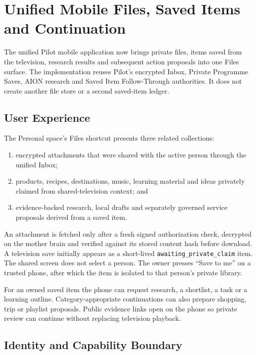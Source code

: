 \begingroup
\sloppy
\section{Unified Mobile Files, Saved Items and Continuation}
\label{sec:pilot-unified-mobile-library}

The unified Pilot mobile application now brings private files, items saved from the television,
research results and subsequent action proposals into one Files surface.  The implementation
reuses Pilot's encrypted Inbox, Private Programme Saves, AION research and Saved Item
Follow-Through authorities.  It does not create another file store or a second saved-item ledger.

\subsection{User Experience}

The Personal space's Files shortcut presents three related collections:
\begin{enumerate}
  \item encrypted attachments that were shared with the active person through the unified Inbox;
  \item products, recipes, destinations, music, learning material and ideas privately claimed
        from shared-television context; and
  \item evidence-backed research, local drafts and separately governed service proposals derived
        from a saved item.
\end{enumerate}

An attachment is fetched only after a fresh signed authorization check, decrypted on the mother
brain and verified against its stored content hash before download.  A television save initially
appears as a short-lived \texttt{awaiting\_private\_claim} item.  The shared screen does not select a
person.  The owner presses ``Save to me'' on a trusted phone, after which the item is isolated to
that person's private library.

For an owned saved item the phone can request research, a shortlist, a task or a learning outline.
Category-appropriate continuations can also prepare shopping, trip or playlist proposals.  Public
evidence links open on the phone so private review can continue without replacing television
playback.

\subsection{Identity and Capability Boundary}

